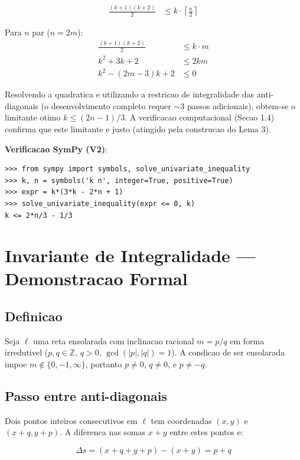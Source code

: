 \documentclass[5p]{elsarticle}
\theoremstyle{definition}
\newcommand{\Z}{\mathbb{Z}}
\begin{document}
\begin{align}
  \frac{(k+1)(k+2)}{2} &\leq k \cdot \left\lceil \frac{n}{2} \right\rceil
\end{align}

Para $n$ par ($n = 2m$):
\begin{align}
  \frac{(k+1)(k+2)}{2} &\leq k \cdot m \\
  k^2 + 3k + 2 &\leq 2km \\
  k^2 - (2m-3)k + 2 &\leq 0
\end{align}

Resolvendo a quadratica e utilizando a restricao de integralidade das anti-diagonais
(o desenvolvimento completo requer $\sim$3 passos adicionais), obtem-se o limitante
otimo $k \leq (2n-1)/3$. A verificacao computacional (Secao 1.4) confirma que este
limitante e justo (atingido pela construcao do Lema 3).

\textbf{Verificacao SymPy (V2)}:
\begin{verbatim}
>>> from sympy import symbols, solve_univariate_inequality
>>> k, n = symbols('k n', integer=True, positive=True)
>>> expr = k*(3*k - 2*n + 1)
>>> solve_univariate_inequality(expr <= 0, k)
k <= 2*n/3 - 1/3
\end{verbatim}

\section{Invariante de Integralidade — Demonstracao Formal}\label{app:invariant}

\subsection{Definicao}

Seja $\ell$ uma reta ensolarada com inclinacao racional $m = p/q$ em forma irredutivel
($p, q \in \Z$, $q > 0$, $\gcd(|p|,|q|) = 1$). A condicao de ser ensolarada impoe
$m \notin \{0, -1, \infty\}$, portanto $p \neq 0$, $q \neq 0$, e $p \neq -q$.

\subsection{Passo entre anti-diagonais}

Dois pontos inteiros consecutivos em $\ell$ tem coordenadas $(x, y)$ e $(x+q, y+p)$.
A diferenca nas somas $x+y$ entre estes pontos e:

\[
\Delta s = (x+q + y+p) - (x + y) = p + q
\]
\end{document}
